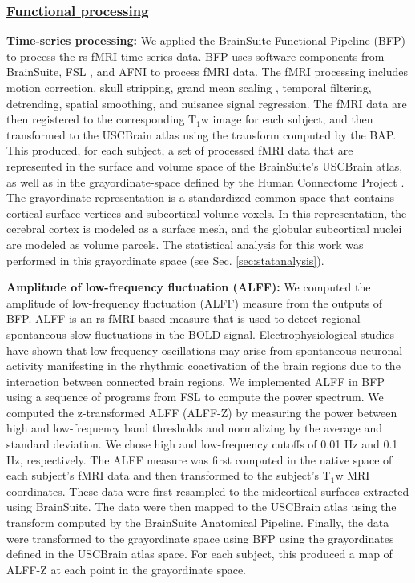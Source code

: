 \documentclass[review,3p,times,12pt,letterpaper]{elsarticle}
\begin{document}
\subsubsection*{\normalfont\underline{Functional processing}}
\noindent\textbf{Time-series processing:}
We applied the BrainSuite Functional Pipeline (BFP) to process the rs-fMRI time-series data. BFP uses software components from BrainSuite, FSL \cite{jenkinson2012fsl}, and AFNI \cite{cox2012afni} to process fMRI data.
The fMRI processing includes motion correction, skull stripping, grand mean scaling \cite{gavrilescu2002simulation}, temporal filtering, detrending, spatial smoothing, and nuisance signal regression. The fMRI data are then registered to the corresponding T$_1$w image for each subject, and then transformed to the USCBrain atlas using the transform computed by the BAP. This produced, for each subject, a set of processed fMRI data that are represented in the surface and volume space of the BrainSuite's USCBrain atlas, as well as in the grayordinate-space defined by the Human Connectome Project \cite{glasser2013minimal}. The grayordinate representation is a standardized common space that contains cortical surface vertices and subcortical volume voxels. In this representation, the cerebral cortex is modeled as a surface mesh, and the globular subcortical nuclei are modeled as volume parcels.
The statistical analysis for this work was performed in this grayordinate space (see Sec. \ref{sec:statanalysis}).


\noindent\textbf{Amplitude of low-frequency fluctuation (ALFF):}
We computed the amplitude of low-frequency fluctuation (ALFF) measure from the outputs of BFP.
ALFF \cite{zuo2010oscillating} is an rs-fMRI-based measure that is used to detect regional spontaneous slow fluctuations in the BOLD signal. Electrophysiological studies \cite{cordes2001frequencies} have shown that low-frequency oscillations may arise from spontaneous neuronal activity manifesting in the rhythmic coactivation of the brain regions due to the interaction between connected brain regions. We implemented ALFF in BFP using a sequence of programs from FSL to compute the power spectrum. We computed the z-transformed ALFF (ALFF-Z) by measuring the power between high and low-frequency band thresholds and normalizing by the average and standard deviation. We chose high and low-frequency cutoffs of 0.01 Hz and 0.1 Hz, respectively. The ALFF measure was first computed in the native space of each subject's fMRI data and then transformed to the subject's T$_1$w MRI coordinates. These data were first resampled to the midcortical surfaces extracted using BrainSuite. The data were then mapped to the USCBrain atlas using the transform computed by the BrainSuite Anatomical Pipeline. Finally, the data were transformed to the grayordinate space using BFP using the grayordinates defined in the USCBrain atlas space. For each subject, this produced a map of ALFF-Z at each point in the grayordinate space. 
\end{document}
